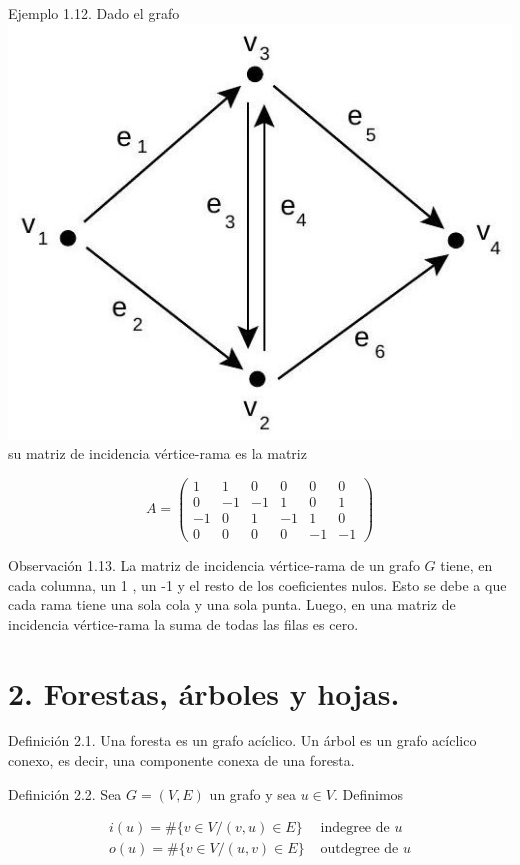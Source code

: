 \documentclass[10pt]{article}
\begin{document}
Ejemplo 1.12. Dado el grafo\\
\includegraphics[max width=\textwidth, center]{2025_09_05_93c7c1835f249f70c0eeg-03}\\
su matriz de incidencia vértice-rama es la matriz

$$
A=\left(\begin{array}{cccccc}
1 & 1 & 0 & 0 & 0 & 0 \\
0 & -1 & -1 & 1 & 0 & 1 \\
-1 & 0 & 1 & -1 & 1 & 0 \\
0 & 0 & 0 & 0 & -1 & -1
\end{array}\right)
$$

Observación 1.13. La matriz de incidencia vértice-rama de un grafo $G$ tiene, en cada columna, un 1 , un -1 y el resto de los coeficientes nulos. Esto se debe a que cada rama tiene una sola cola y una sola punta. Luego, en una matriz de incidencia vértice-rama la suma de todas las filas es cero.

\section*{2. Forestas, árboles y hojas.}
Definición 2.1. Una foresta es un grafo acíclico. Un árbol es un grafo acíclico conexo, es decir, una componente conexa de una foresta.

Definición 2.2. Sea $G=(V, E)$ un grafo y sea $u \in V$. Definimos

$$
\begin{array}{ll}
i(u)=\#\{v \in V /(v, u) \in E\} & \text { indegree de } u \\
o(u)=\#\{v \in V /(u, v) \in E\} & \text { outdegree de } u
\end{array}
$$
\end{document}

